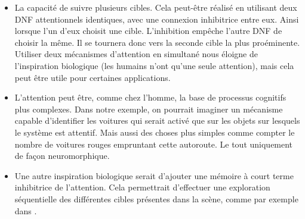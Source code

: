 	\begin{itemize}
		\item La capacité de suivre plusieurs cibles. Cela peut-être réalisé en utilisant deux DNF attentionnels identiques, avec une connexion inhibitrice entre eux. Ainsi lorsque l'un d'eux choisit une cible. L'inhibition empêche l'autre DNF de choisir la même. Il se tournera donc vers la seconde cible la plus proéminente. Utiliser deux mécanismes d'attention en simultané nous éloigne de l'inspiration biologique (les humains n'ont qu'une seule attention), mais cela peut être utile pour certaines applications.
		\item L'attention peut être, comme chez l'homme, la base de processus cognitifs plus complexes. Dans notre exemple, on pourrait imaginer un mécanisme capable d'identifier les voitures qui serait activé que sur les objets sur lesquels le système est attentif. Mais aussi des choses plus simples comme compter le nombre de voitures rouges empruntant cette autoroute. Le tout uniquement de façon neuromorphique.
		\item Une autre inspiration biologique serait d'ajouter une mémoire à court terme inhibitrice de l'attention. Cela permettrait d'effectuer une exploration séquentielle des différentes cibles présentes dans la scène, comme par exemple dans \cite{fix2011dynamic}.
	\end{itemize}
		

